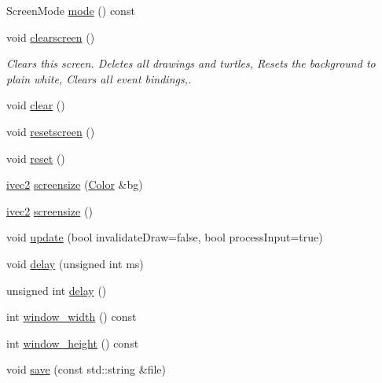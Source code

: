 \begin{DoxyCompactItemize}
\item 
Screen\+Mode \hyperlink{classcturtle_1_1InteractiveTurtleScreen_af65c66dbfe93fa748944f7a6d299080e}{mode} () const
\item 
\mbox{\label{classcturtle_1_1InteractiveTurtleScreen_ae4e184867d7ed83c58e0ef9e730f4d73}} 
void \hyperlink{classcturtle_1_1InteractiveTurtleScreen_ae4e184867d7ed83c58e0ef9e730f4d73}{clearscreen} ()
\begin{DoxyCompactList}\small\item\em Clears this screen. Deletes all drawings and turtles, Resets the background to plain white, Clears all event bindings,. \end{DoxyCompactList}\item 
void \hyperlink{classcturtle_1_1InteractiveTurtleScreen_a60eecd547f88d1e52b1d0917693bffb8}{clear} ()
\item 
void \hyperlink{classcturtle_1_1InteractiveTurtleScreen_a06471bf6c8c02768fb0acd89649c72c2}{resetscreen} ()
\item 
void \hyperlink{classcturtle_1_1InteractiveTurtleScreen_a2863ede773ae592ad119b317b3704ce8}{reset} ()
\item 
\hyperlink{structcturtle_1_1ivec2}{ivec2} \hyperlink{classcturtle_1_1InteractiveTurtleScreen_a005b25693386718a6d80feeac677d255}{screensize} (\hyperlink{classcturtle_1_1Color}{Color} \&bg)
\item 
\hyperlink{structcturtle_1_1ivec2}{ivec2} \hyperlink{classcturtle_1_1InteractiveTurtleScreen_a1263d763eb9ef1b39f2e8c0a445d6a85}{screensize} ()
\item 
void \hyperlink{classcturtle_1_1InteractiveTurtleScreen_adfefb43645347feb832072f8fc8da144}{update} (bool invalidate\+Draw=false, bool process\+Input=true)
\item 
void \hyperlink{classcturtle_1_1InteractiveTurtleScreen_a6e32b852cbd029d6649107d838c798a9}{delay} (unsigned int ms)
\item 
unsigned int \hyperlink{classcturtle_1_1InteractiveTurtleScreen_a2776d2a194e14b7adbc94ce502ee9409}{delay} ()
\item 
int \hyperlink{classcturtle_1_1InteractiveTurtleScreen_aefeb4e90fae07d043677f3dee9a29026}{window\+\_\+width} () const
\item 
int \hyperlink{classcturtle_1_1InteractiveTurtleScreen_a259883332b284e3b8a97b5bfb74f988d}{window\+\_\+height} () const
\item 
void \hyperlink{classcturtle_1_1InteractiveTurtleScreen_ab0ded9c577f523ca45240e036318553e}{save} (const std\+::string \&file)

\end{DoxyCompactItemize}
